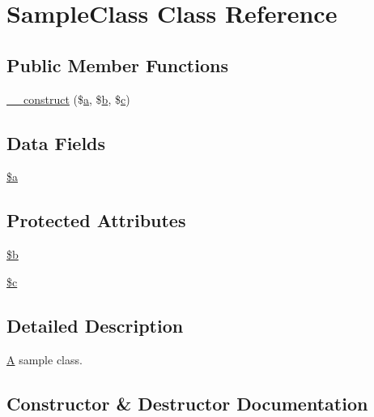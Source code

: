 \hypertarget{class_sebastian_bergmann_1_1_comparator_1_1_sample_class}{}\section{Sample\+Class Class Reference}
\label{class_sebastian_bergmann_1_1_comparator_1_1_sample_class}
\subsection*{Public Member Functions}
\begin{DoxyCompactItemize}
\item 
\mbox{\hyperlink{class_sebastian_bergmann_1_1_comparator_1_1_sample_class_a72cf3ec936279bc10099664c3d340871}{\+\_\+\+\_\+construct}} (\$\mbox{\hyperlink{interfacea}{a}}, \$\mbox{\hyperlink{interfaceb}{b}}, \$\mbox{\hyperlink{classc}{c}})
\end{DoxyCompactItemize}
\subsection*{Data Fields}
\begin{DoxyCompactItemize}
\item 
\mbox{\hyperlink{class_sebastian_bergmann_1_1_comparator_1_1_sample_class_acebf83966ef6d7e5645a6b62ba368f9f}{\$a}}
\end{DoxyCompactItemize}
\subsection*{Protected Attributes}
\begin{DoxyCompactItemize}
\item 
\mbox{\hyperlink{class_sebastian_bergmann_1_1_comparator_1_1_sample_class_ab9eb087b791749ae45deabb0899b7ccc}{\$b}}
\item 
\mbox{\hyperlink{class_sebastian_bergmann_1_1_comparator_1_1_sample_class_ab73d7f4f2dae233dd561e7fdaab3a77b}{\$c}}
\end{DoxyCompactItemize}


\subsection{Detailed Description}
\mbox{\hyperlink{class_a}{A}} sample class. 

\subsection{Constructor \& Destructor Documentation}
\mbox{\label{class_sebastian_bergmann_1_1_comparator_1_1_sample_class_a72cf3ec936279bc10099664c3d340871}} 
